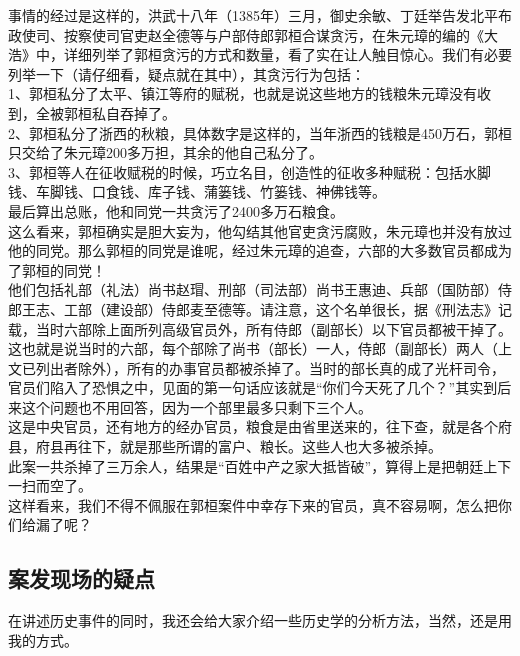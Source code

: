 \begin{multicols}{\theparacolNo}
事情的经过是这样的，洪武十八年（1385年）三月，御史余敏、丁廷举告发北平布政使司、按察使司官吏赵全德等与户部侍郎郭桓合谋贪污，在朱元璋的编的《大浩》中，详细列举了郭桓贪污的方式和数量，看了实在让人触目惊心。我们有必要列举一下（请仔细看，疑点就在其中），其贪污行为包括：\\

1、郭桓私分了太平、镇江等府的赋税，也就是说这些地方的钱粮朱元璋没有收到，全被郭桓私自吞掉了。\\

2、郭桓私分了浙西的秋粮，具体数字是这样的，当年浙西的钱粮是450万石，郭桓只交给了朱元璋200多万担，其余的他自己私分了。\\

3、郭桓等人在征收赋税的时候，巧立名目，创造性的征收多种赋税：包括水脚钱、车脚钱、口食钱、库子钱、蒲篓钱、竹篓钱、神佛钱等。\\

最后算出总账，他和同党一共贪污了2400多万石粮食。\\

这么看来，郭桓确实是胆大妄为，他勾结其他官吏贪污腐败，朱元璋也并没有放过他的同党。那么郭桓的同党是谁呢，经过朱元璋的追查，六部的大多数官员都成为了郭桓的同党！\\

他们包括礼部（礼法）尚书赵瑁、刑部（司法部）尚书王惠迪、兵部（国防部）侍郎王志、工部（建设部）侍郎麦至德等。请注意，这个名单很长，据《刑法志》记载，当时六部除上面所列高级官员外，所有侍郎（副部长）以下官员都被干掉了。\\

这也就是说当时的六部，每个部除了尚书（部长）一人，侍郎（副部长）两人（上文已列出者除外），所有的办事官员都被杀掉了。当时的部长真的成了光杆司令，官员们陷入了恐惧之中，见面的第一句话应该就是“你们今天死了几个？”其实到后来这个问题也不用回答，因为一个部里最多只剩下三个人。\\

这是中央官员，还有地方的经办官员，粮食是由省里送来的，往下查，就是各个府县，府县再往下，就是那些所谓的富户、粮长。这些人也大多被杀掉。\\

此案一共杀掉了三万余人，结果是“百姓中产之家大抵皆破”，算得上是把朝廷上下一扫而空了。\\

这样看来，我们不得不佩服在郭桓案件中幸存下来的官员，真不容易啊，怎么把你们给漏了呢？\\

\subsection{案发现场的疑点}
在讲述历史事件的同时，我还会给大家介绍一些历史学的分析方法，当然，还是用我的方式。\\


\end{multicols}
